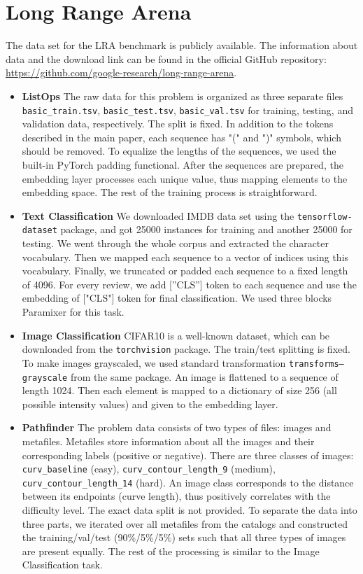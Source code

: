 \documentclass{article}
\begin{document}
\section{Long Range Arena}

The data set for the LRA benchmark is publicly available. The information about data and the download link can be found in the official GitHub repository: \url{https://github.com/google-research/long-range-arena}.

\begin{itemize}
    \item \textbf{ListOps} The raw data for this problem is organized as three separate files \texttt{basic\_train.tsv}, \texttt{basic\_test.tsv}, \texttt{basic\_val.tsv} for training, testing, and validation data, respectively. The split is fixed. In addition to the tokens described in the main paper, each sequence has "(" and ")" symbols, which should be removed. To equalize the lengths of the sequences, we used the built-in PyTorch padding functional. After the sequences are prepared, the embedding layer processes each unique value, thus mapping elements to the embedding space. The rest of the training process is straightforward. 
    \item \textbf{Text Classification} We downloaded IMDB data set using the \texttt{tensorflow-dataset} package, and got 25000 instances for training and another 25000 for testing. We went through the whole corpus and extracted the character vocabulary. Then we mapped each sequence to a vector of indices using this vocabulary. Finally, we truncated or padded each sequence to a fixed length of 4096. For every review, we add [”CLS”] token to each sequence and use the embedding of ["CLS"] token for final classification. We used three blocks Paramixer for this task. 
    \item \textbf{Image Classification} CIFAR10 is a well-known dataset, which can be downloaded from the \texttt{torchvision} package. The train/test splitting is fixed. To make images grayscaled, we used standard transformation \texttt{transforms—grayscale} from the same package. An image is flattened to a sequence of length 1024. Then each element is mapped to a dictionary of size 256 (all possible intensity values) and given to the embedding layer.  
    \item \textbf{Pathfinder} The problem data consists of two types of files: images and metafiles. Metafiles store information about all the images and their corresponding labels (positive or negative). There are three classes of images: \texttt{curv\_baseline} (easy), \texttt{curv\_contour\_length\_9} (medium), \texttt{curv\_contour\_length\_14} (hard). An image class corresponds to the distance between its endpoints (curve length), thus positively correlates with the difficulty level. The exact data split is not provided. To separate the data into three parts, we iterated over all metafiles from the catalogs and constructed the training/val/test (90\%/5\%/5\%) sets such that all three types of images are present equally. The rest of the processing is similar to the Image Classification task.
\end{itemize}
\end{document}

